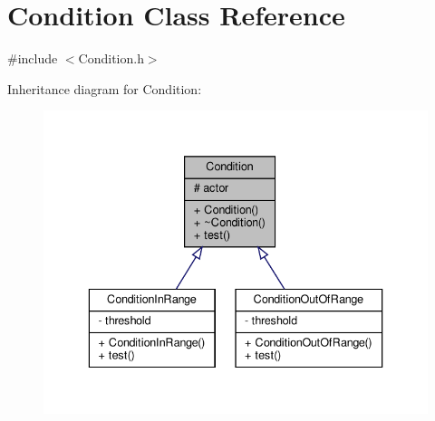 \hypertarget{classCondition}{}\section{Condition Class Reference}
\label{classCondition}


{\ttfamily \#include $<$Condition.\+h$>$}



Inheritance diagram for Condition\+:
\nopagebreak
\begin{figure}[H]
\begin{center}
\leavevmode
\includegraphics[width=336pt]{classCondition__inherit__graph}
\end{center}
\end{figure}


